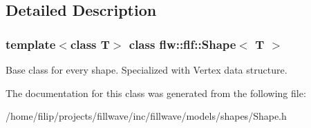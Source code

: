 \subsection{Detailed Description}
\subsubsection*{template$<$class T$>$\newline
class flw\+::flf\+::\+Shape$<$ T $>$}

Base class for every shape. Specialized with Vertex data structure. 

The documentation for this class was generated from the following file\+:\begin{DoxyCompactItemize}
\item 
/home/filip/projects/fillwave/inc/fillwave/models/shapes/Shape.\+h\end{DoxyCompactItemize}
